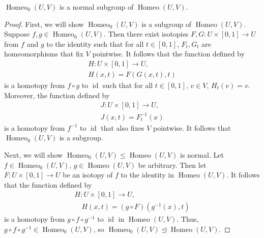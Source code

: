 \documentclass{amsart}
\DeclareMathOperator{\id}{id}
\DeclareMathOperator{\Homeo}{Homeo}
\begin{document}
\begin{proposition}
  \(\Homeo_0(U, V)\) is a normal subgroup of \(\Homeo(U, V)\).
\end{proposition}
\begin{proof}
	First, we will show \(\Homeo_0(U, V)\) is a subgroup of \(\Homeo(U, V)\).
	Suppose \(f, g\in\Homeo_0(U, V)\). Then there exist isotopies \(F, G:
	U\times [0, 1]\to U\) from \(f\) and \(g\) to the identity such that for all
	\(t\in[0, 1]\), \(F_t, G_t\) are
	homeomorphisms that fix \(V\) pointwise. It follows that the function
	defined by 
	\begin{align*}
		H: U\times [0, 1]\to U,\\
		H(x, t) = F(G(x, t), t)
	\end{align*}
	is a homotopy from \(f\circ g\) to \(\id\) such that for all
	\(t\in [0, 1]\), \(v\in V\), \(H_t(v) = v\).
	Moreover, the function defined by 
	\begin{align*}
		J: U\times [0, 1]\to U,\\
		J(x, t) = F_t^{-1}(x)
	\end{align*}
	is a homotopy from \(f^{-1}\) to \(\id\) that also fixes
	\(V\) pointwise. It follows that \(\Homeo_0(U, V)\) is a subgroup.

	Next, we will show \(\Homeo_0(U, V)\le\Homeo(U, V)\) is normal. Let
	\(f\in\Homeo_0(U, V)\), \(g\in\Homeo(U, V)\) be arbitrary. Then let \(F:
	U\times [0, 1]\to U\) be an isotopy of \(f\) to the identity in \(\Homeo(U,
	V)\). It follows that the function defined by 
	\begin{align*}
		H: U\times [0, 1]\to U,\\
		\quad H(x, t) = (g\circ F)(g^{-1}(x), t)
	\end{align*} 
	is a homotopy from \(g\circ f\circ g^{-1}\) to \(\id\) in
	\(\Homeo(U, V)\). Thus, \(g\circ f\circ g^{-1}\in\Homeo_0(U, V)\), so
	\(\Homeo_0(U, V)\trianglelefteq\Homeo(U, V)\).
\end{proof}
\end{document}
